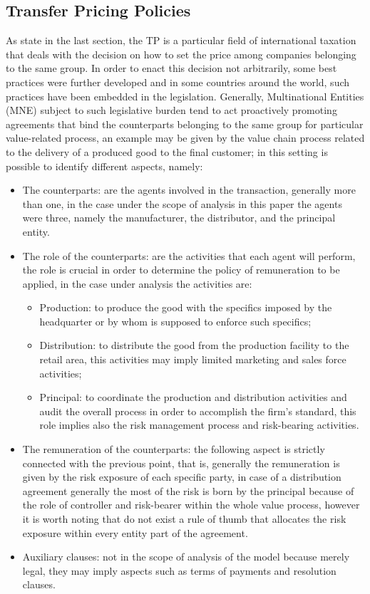 \documentclass[conference,final,]{IEEEtran}
\begin{document}
\hypertarget{transfer-pricing}{%
\subsection{Transfer Pricing Policies}\label{transfer-pricing}}
As state in the last section, the TP is a particular field of international taxation that deals with the decision on how to set the price among companies belonging to the same group. In order to enact this decision not arbitrarily, some best practices were further developed \cite{oecd17} and in some countries around the world, such practices have been embedded in the legislation. Generally, Multinational Entities (MNE) subject to such legislative burden tend to act proactively promoting agreements that bind the counterparts belonging to the same group for particular value-related process, an example may be given by the value chain process related to the delivery of a produced good to the final customer; in this setting is possible to identify different aspects, namely:
\begin{itemize}
\item The counterparts: are the agents involved in the transaction, generally more than one, in the case under the scope of analysis in this paper the agents were three, namely the manufacturer, the distributor, and the principal entity.
\item The role of the counterparts: are the activities that each agent will perform, the role is crucial in order to determine the policy of remuneration to be applied, in the case under analysis the activities are:
  \begin{itemize}
  \item Production: to produce the good with the specifics imposed by the headquarter or by whom is supposed to enforce such specifics;
  \item Distribution: to distribute the good from the production facility to the retail area, this activities may imply limited marketing and sales force activities;
  \item Principal: to coordinate the production and distribution activities and audit the overall process in order to accomplish the firm's standard, this role implies also the risk management process and risk-bearing activities.
  \end{itemize}
\item The remuneration of the counterparts: the following aspect is strictly connected with the previous point, that is, generally the remuneration is given by the risk exposure of each specific party, in case of a distribution agreement generally the most of the risk is born by the principal because of the role of controller and risk-bearer within the whole value process, however it is worth noting that do not exist a rule of thumb that allocates the risk exposure within every entity part of the agreement.
\item Auxiliary clauses: not in the scope of analysis of the model because merely legal, they may imply aspects such as terms of payments and resolution clauses.
\end{itemize}
\end{document}
